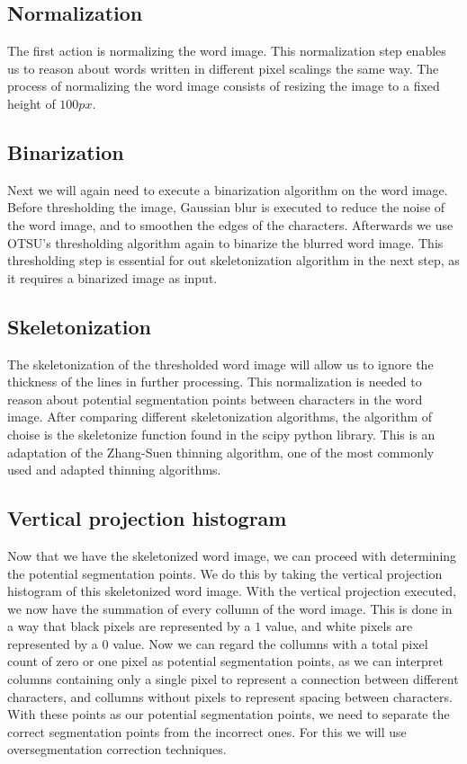 \documentclass{article}
\begin{document}
\subsection{Normalization} %
The first action is normalizing the word image.
This normalization step enables us to reason about words written in different pixel scalings the same way.
The process of normalizing the word image consists of resizing the image to a fixed height of $100px$.

\subsection{Binarization}
Next we will again need to execute a binarization algorithm on the word image.
Before thresholding the image, Gaussian blur is executed to reduce the noise of the word image, and to smoothen the edges of the characters.
Afterwards we use OTSU's thresholding algorithm again to binarize the blurred word image.
This thresholding step is essential for out skeletonization algorithm in the next step, as it requires a binarized image as input.

\subsection{Skeletonization}
The skeletonization of the thresholded word image will allow us to ignore the thickness of the lines in further processing.
This normalization is needed to reason about potential segmentation points between characters in the word image.
After comparing different skeletonization algorithms, the algorithm of choise is the skeletonize function found in the scipy python library.
This is an adaptation of the Zhang-Suen thinning algorithm, one of the most commonly used and adapted thinning algorithms.
\cite{zsthinning}

\subsection{Vertical projection histogram}
Now that we have the skeletonized word image, we can proceed with determining the potential segmentation points.
We do this by taking the vertical projection histogram of this skeletonized word image.
With the vertical projection executed, we now have the summation of every collumn of the word image.
This is done in a way that black pixels are represented by a $1$ value, and white pixels are represented by a $0$ value.
Now we can regard the collumns with a total pixel count of zero or one pixel as potential segmentation points, as we can interpret columns containing only a single pixel to represent a connection between different characters, and collumns without pixels to represent spacing between characters.
With these points as our potential segmentation points, we need to separate the correct segmentation points from the incorrect ones.
For this we will use oversegmentation correction techniques.
\end{document}
